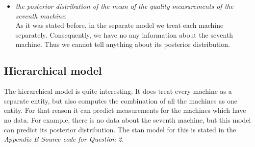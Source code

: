 \documentclass[11pt,a4paper,english]{article}
\begin{document}
\begin{itemize}
            \item \textit{the posterior distribution of the mean of the quality measurements of the seventh machine}: \\
              As it was stated before, in the separate model we treat each machine separately. Consequently, we have no any information about the seventh machine. Thus we cannot tell anything about its posterior distribution.
          \end{itemize}

        \subsection{Hierarchical model}
          The hierarchical model is quite interesting. It does treat every machine as a separate entity, but also computes the combination of all the machines as one entity. For that reason it can predict measurements for the machines which have no data. For example, there is no data about the seventh machine, but this model can predict its posterior distribution. The stan model for this is stated in the \textit{Appendix B  Source code for Question 2}.
\end{document}
